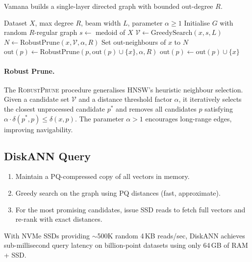 \documentclass[11pt,a4paper]{article}
\theoremstyle{definition}
\begin{document}
Vamana builds a single-layer directed graph with bounded out-degree $R$.

\begin{algorithm}[H]
\caption{Vamana Index Construction}
\begin{algorithmic}[1]
\Require Dataset $X$, max degree $R$, beam width $L$, parameter $\alpha \geq 1$
\State Initialise $G$ with random $R$-regular graph
\State $s \gets$ medoid of $X$ 
  \State $\mathcal{V} \gets \text{GreedySearch}(x, s, L)$ 
  \State $N \gets \text{RobustPrune}(x, \mathcal{V}, \alpha, R)$
  \State Set out-neighbours of $x$ to $N$
      \State $\text{out}(p) \gets \text{RobustPrune}(p, \text{out}(p) \cup \{x\}, \alpha, R)$
    \Else
      \State $\text{out}(p) \gets \text{out}(p) \cup \{x\}$
    \EndIf
  \EndFor
\EndFor
\end{algorithmic}
\end{algorithm}

\paragraph{Robust Prune.}
The \textsc{RobustPrune} procedure generalises HNSW's heuristic
neighbour selection.  Given a candidate set $\mathcal{V}$ and a distance
threshold factor $\alpha$, it iteratively selects the closest
unprocessed candidate $p^*$ and removes all candidates $p$ satisfying
$\alpha \cdot \delta(p^*, p) \leq \delta(x, p)$.  The parameter
$\alpha > 1$ encourages long-range edges, improving navigability.

\subsection{DiskANN Query}

\begin{enumerate}[nosep]
  \item Maintain a PQ-compressed copy of all vectors in memory.
  \item Greedy search on the graph using PQ distances (fast, approximate).
  \item For the most promising candidates, issue SSD reads to fetch full
    vectors and re-rank with exact distances.
\end{enumerate}

With NVMe SSDs providing $\sim$500K random 4\,KB reads/sec, DiskANN
achieves sub-millisecond query latency on billion-point datasets using
only 64\,GB of RAM + SSD.
\end{document}
